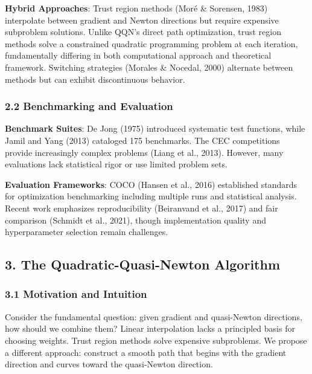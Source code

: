 \textbf{Hybrid Approaches}: Trust region methods (Moré \& Sorensen, 1983) interpolate between gradient and Newton directions but require expensive subproblem solutions.
Unlike QQN's direct path optimization, trust region methods solve a constrained quadratic programming problem at each iteration, fundamentally differing in both computational approach and theoretical framework.
Switching strategies (Morales \& Nocedal, 2000) alternate between methods but can exhibit discontinuous behavior.

\hypertarget{benchmarking-and-evaluation}{%
\subsubsection{2.2 Benchmarking and Evaluation}\label{benchmarking-and-evaluation}}

\textbf{Benchmark Suites}: De Jong (1975) introduced systematic test functions, while Jamil and Yang (2013) cataloged 175 benchmarks.
The CEC competitions provide increasingly complex problems (Liang et al., 2013).
However, many evaluations lack statistical rigor or use limited problem sets.

\textbf{Evaluation Frameworks}: COCO (Hansen et al., 2016) established standards for optimization benchmarking including multiple runs and statistical analysis.
Recent work emphasizes reproducibility (Beiranvand et al., 2017) and fair comparison (Schmidt et al., 2021), though implementation quality and hyperparameter selection remain challenges.

\hypertarget{the-quadratic-quasi-newton-algorithm}{%
\subsection{3. The Quadratic-Quasi-Newton Algorithm}\label{the-quadratic-quasi-newton-algorithm}}

\hypertarget{motivation-and-intuition}{%
\subsubsection{3.1 Motivation and Intuition}\label{motivation-and-intuition}}

Consider the fundamental question: given gradient and quasi-Newton directions, how should we combine them?
Linear interpolation lacks a principled basis for choosing weights.
Trust region methods solve expensive subproblems.
We propose a different approach: construct a smooth path that begins with the gradient direction and curves toward the quasi-Newton direction.

